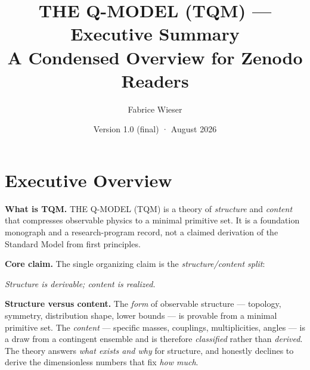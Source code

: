 \documentclass[10pt,a4paper]{article}
\title{\bfseries THE Q-MODEL (TQM) — Executive Summary\\[2mm]
\large A Condensed Overview for Zenodo Readers}
\author{Fabrice Wieser}
\date{Version 1.0 (final) \quad·\quad 15 August 2026}
\begin{document}
\maketitle

\begin{center}
\end{center}

\vspace{2mm}

\section{Executive Overview}

\textbf{What is TQM.} THE Q-MODEL (TQM) is a theory of \emph{structure} and \emph{content}
that compresses observable physics to a minimal primitive set. It is a foundation
monograph and a research-program record, not a claimed derivation of the Standard Model
from first principles.

\textbf{Core claim.} The single organizing claim is the \emph{structure/content split}:

\begin{center}
\emph{Structure is derivable; content is realized.}
\end{center}

\textbf{Structure versus content.} The \emph{form} of observable structure --- topology,
symmetry, distribution shape, lower bounds --- is provable from a minimal primitive set.
The \emph{content} --- specific masses, couplings, multiplicities, angles --- is a draw
from a contingent ensemble and is therefore \emph{classified} rather than \emph{derived}.
The theory answers \emph{what exists and why} for structure, and honestly declines to
derive the dimensionless numbers that fix \emph{how much}.
\end{document}
